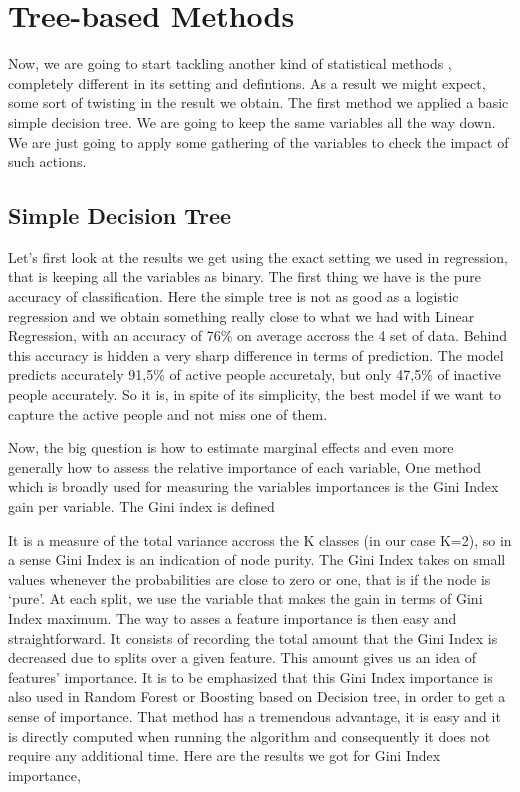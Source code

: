 \section{Tree-based Methods}

Now, we are going to start tackling another kind of statistical methods , completely different in its setting and defintions.
As a result we might expect, some sort of twisting in the result we obtain.
The first method we applied a basic simple decision tree.
We are going to keep the same variables all the way down. We are just going to apply some gathering of the variables to check the impact of such actions.

\subsection{Simple Decision Tree}

Let’s first look at the results we get using the exact setting we used in regression, that is keeping all the variables as binary.
The first thing we have is the pure accuracy of classification. Here the simple tree is not as good as a logistic regression and we obtain something really close to what we had with Linear Regression, with an accuracy of 76\% on average accross the 4 set of data. Behind this accuracy is hidden a very sharp difference in terms of prediction. The model predicts accurately 91,5\% of active people accuretaly, but only 47,5\% of inactive people accurately. So it is, in spite of its simplicity, the best model if we want to capture the active people and not miss one of them.

Now, the big question is how to estimate marginal effects and even more generally how to assess the relative importance of each variable,
One method which is broadly used for measuring the variables importances is the Gini Index gain per variable. The Gini index is defined


It is a measure of the total variance accross the K classes (in our case K=2), so in a sense Gini Index is an indication of node purity. The Gini Index takes on small values whenever the probabilities are close to zero or one, that is if the node is ‘pure’. At each split, we use the variable that makes the gain in terms of Gini Index maximum.
The way to asses a feature importance is then easy and straightforward. It consists of recording the total amount that the Gini Index is decreased due to splits over a given feature. This amount gives us an idea of features’ importance.
It is to be emphasized that this Gini Index importance is also used in Random Forest or Boosting based on Decision tree, in order to get a sense of importance.
That method has a tremendous advantage, it is easy and it is directly computed when running the algorithm and consequently it does not require any additional time.
Here are the results we got for Gini Index importance,

